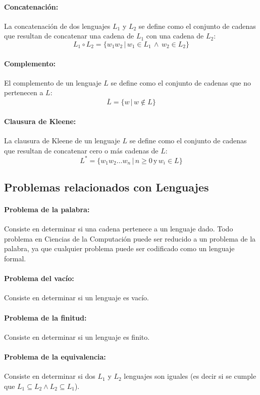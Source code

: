 \documentclass{article}
\begin{document}
\paragraph{Concatenación:} La concatenación de dos lenguajes $L_1$ y $L_2$ se define como el conjunto
de cadenas que resultan de concatenar una cadena de $L_1$ con una cadena de $L_2$:
$$L_1\circ L_2=\{w_1w_2\,|\,w_1\in L_1\,\wedge\,w_2\in L_2\}$$
\paragraph{Complemento:} El complemento de un lenguaje $L$ se define como el conjunto de cadenas que no
pertenecen a $L$:
$$\overline{L}=\{w\,|\,w\notin L\}$$
\paragraph{Clausura de Kleene:} La clausura de Kleene de un lenguaje $L$ se define como el conjunto de
cadenas que resultan de concatenar cero o más cadenas de $L$:
$$L^*=\{w_1w_2\ldots w_n\,|\,n\geq 0\,\text{y}\,w_i\in L\}$$

\subsection{Problemas relacionados con Lenguajes}

\paragraph{Problema de la palabra:} Consiste en determinar si una cadena pertenece a un lenguaje dado. Todo problema en Ciencias de la Computación puede ser reducido a un problema de la palabra, ya que cualquier problema
puede ser codificado como un lenguaje formal.
\paragraph{Problema del vacío:} Consiste en determinar si un lenguaje es vacío.
\paragraph{Problema de la finitud:} Consiste en determinar si un lenguaje es finito.
\paragraph{Problema de la equivalencia:} Consiste en determinar si dos $L_1$ y $L_2$ lenguajes son iguales (es decir si se cumple que
$L_1\subseteq L_2 \wedge L_2\subseteq L_1$).
\end{document}
